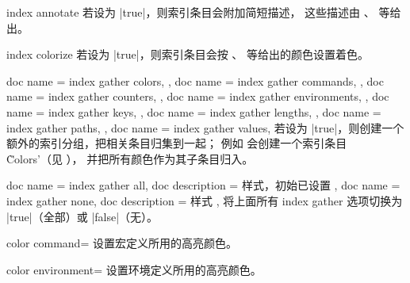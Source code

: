 \begin{docTcbKey}{index annotate}{}{}
  若设为 |true|，则索引条目会附加简短描述，
  这些描述由 、
  等给出。
\end{docTcbKey}

\begin{docTcbKey}{index colorize}{}{}
  若设为 |true|，则索引条目会按
  、
  等给出的颜色设置着色。
\end{docTcbKey}


\begin{docTcbKeys}[
    doc new          = {2022-06-20},
    doc key choices* = {defaultinit=true,false}
  ]
  {
    {
      doc name        = index gather colors,
    },
    {
      doc name        = index gather commands,
    },
    {
      doc name        = index gather counters,
    },
    {
      doc name        = index gather environments,
    },
    {
      doc name        = index gather keys,
    },
    {
      doc name        = index gather lengths,
    },
    {
      doc name        = index gather paths,
    },
    {
      doc name        = index gather values,
    }
  }
  若设为 |true|，则创建一个额外的索引分组，把相关条目归集到一起；
  例如  会创建一个索引条目
  \`Colors'（见 ），
  并把所有颜色作为其子条目归入。
\end{docTcbKeys}


\begin{docTcbKeys}[
    doc new={2022-06-20},
    doc parameter = {},
  ]
  {
    {
      doc name        = index gather all,
      doc description = {样式，初始已设置}
    },
    {
      doc name        = index gather none,
      doc description = {样式}
    },
  }
  将上面所有 index gather 选项切换为 |true|（全部）或 |false|（无）。
\end{docTcbKeys}

\clearpage

\begin{docTcbKey}{color command}{=}{}
  设置宏定义所用的高亮颜色。
\end{docTcbKey}

\begin{docTcbKey}{color environment}{=}{}
  设置环境定义所用的高亮颜色。
\end{docTcbKey}

